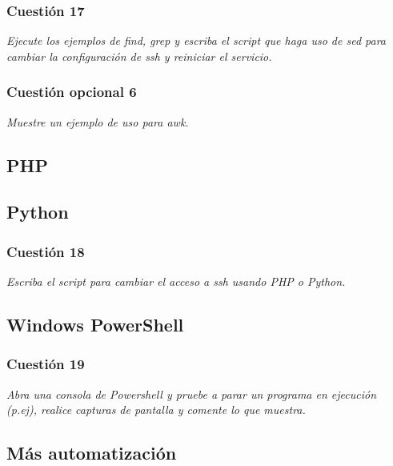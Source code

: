 \subsubsection{Cuestión 17}
\textit{Ejecute los ejemplos de find, grep y escriba el script que haga uso de sed para cambiar la configuración de ssh y reiniciar el servicio.}







\subsubsection{Cuestión opcional 6}
\textit{Muestre un ejemplo de uso para awk.}






\subsection{PHP}
\subsection{Python}
\subsubsection{Cuestión 18}
\textit{Escriba el script para cambiar el acceso a ssh usando PHP o Python.}





\subsection{Windows PowerShell}
\subsubsection{Cuestión 19}
\textit{Abra una consola de Powershell y pruebe a parar un programa en ejecución (p.ej), realice capturas de pantalla y comente lo que muestra.}

\subsection{Más automatización}


\newpage




